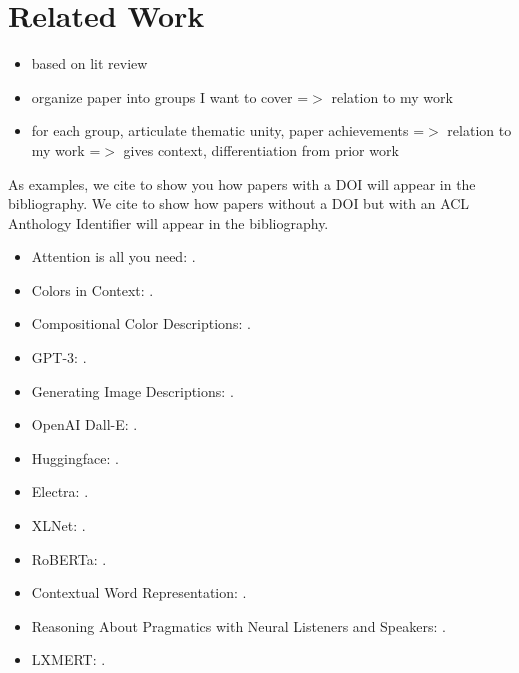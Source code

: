 \section{Related Work}

\begin{itemize}
  \item based on lit review
  \item organize paper into groups I want to cover =$>$ relation to my work
  \item for each group, articulate thematic unity, paper achievements =$>$ relation to my work =$>$ gives context, differentiation from prior work
\end{itemize}

As examples, we cite \citep{vaswani-2017-attention} to show you how papers with a DOI will appear in the bibliography.
We cite \citep{monroe-2017-colors} to show how papers without a DOI but with an ACL Anthology Identifier will appear in the bibliography.

\begin{itemize}
  \item Attention is all you need: \citep{vaswani-2017-attention}.
  \item Colors in Context: \citep{monroe-2017-colors}.
  \item Compositional Color Descriptions: \citep{monroe-2016-compositional}.
  \item GPT-3: \citep{brown-2020-gpt3}.
  \item Generating Image Descriptions: \citep{karpathy-2014-image_descriptions}.
  \item OpenAI Dall-E: \citep{openai-2020-dalle}.
  \item Huggingface: \citep{wolf-2019-huggingface}.
  \item Electra: \citep{clark-2020-electra}.
  \item XLNet: \citep{yang-2019-xlnet}.
  \item RoBERTa: \citep{liu-2019-roberta}.
  \item Contextual Word Representation: \citep{smith-2019-contextual}.
  \item Reasoning About Pragmatics with Neural Listeners and Speakers: \citep{andreas-2016-reasoning}.
  \item LXMERT: \citep{tan-2019-lxmert}.
\end{itemize}
